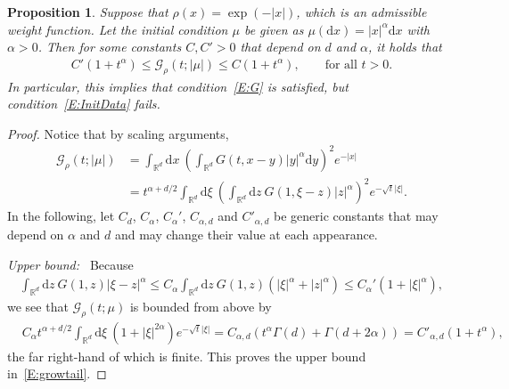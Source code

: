 \documentclass[sn-mathphys]{sn-jnl}%
\renewcommand{\R}{\mathbb{R}}
\newcommand{\ud}{\ensuremath{\mathrm{d}}}
\numberwithin{equation}{section}
\theoremstyle{thmstyleone}%
\newtheorem{proposition}[theorem]{Proposition}%
\theoremstyle{thmstyletwo}%
\theoremstyle{thmstylethree}%
\begin{document}
\begin{proposition}\label{P:growtail}
  Suppose that $\rho(x) = \exp(-\lvert x \rvert)$, which is an admissible weight function. Let the initial
  condition $\mu$ be given as $\mu(\ud x) = \lvert x \rvert^\alpha \ud x$ with $\alpha>0$. Then for some
  constants $C, C'>0$ that depend on $d$ and $\alpha$, it holds that
  \begin{align}\label{E:growtail}
    C' (1+t^\alpha) \le \mathcal{G}_\rho(t;\lvert \mu \rvert) \le C (1+t^\alpha), \qquad \text{for all $t>0$}.
  \end{align}
  In particular, this implies that condition~\eqref{E:G} is satisfied, but condition~\eqref{E:InitData} fails.
\end{proposition}
\begin{proof}
  Notice that by scaling arguments,
  \begin{align*}
    \mathcal{G}_\rho(t;\lvert \mu \rvert)
      & = \int_{\R^d} \ud x \: \left(\int_{\R^d}G(t,x-y) \lvert y \rvert^\alpha \ud y\right)^2 e^{-\lvert x \rvert} \\
      & = t^{\alpha+d/2} \int_{\R^d} \ud\xi\: \left(\int_{\R^d}\ud z \: G\left(1,\xi-z\right) \lvert z \rvert^\alpha\right)^2 e^{-\sqrt{t}\lvert\xi\rvert}.
  \end{align*}
  In the following, let $C_d$, $C_\alpha$, $C_\alpha'$, $C_{\alpha, d}$ and $C'_{\alpha, d}$ be
  generic constants that may depend on $\alpha $ and $d$ and may change their value at each
  appearance. \medskip

  \noindent\textit{Upper bound:~} Because
  \begin{align*}
    \int_{\R^d} \ud z\: G\left(1,z\right) \lvert \xi-z \rvert^\alpha
    \le C_\alpha \int_{\R^d} \ud z\: G\left(1,z\right) \left(\lvert\xi\rvert^\alpha + \lvert z \rvert^\alpha\right)
    \le C_\alpha' \left(1+\lvert\xi\rvert^\alpha\right),
  \end{align*}
  we see that $\mathcal{G}_\rho(t;\mu)$ is bounded from above by
  \begin{align*}
    & C_\alpha t^{\alpha+d/2} \int_{\R^d} \ud \xi\: \left(1+\lvert\xi\rvert^{2\alpha}\right) e^{-\sqrt{t}\lvert\xi\rvert}
      = C_{\alpha, d} \left(t^\alpha \Gamma(d) + \Gamma(d+2\alpha)\right)
      = C'_{\alpha, d} (1+ t^\alpha),
  \end{align*}
  the far right-hand of which is finite. This proves the upper bound in~\eqref{E:growtail}. \medskip


\end{proof}
\end{document}
